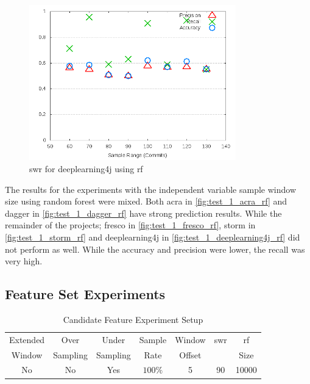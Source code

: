 \begin{figure}[!ht]
    \centering
        \includegraphics[width=0.8\textwidth]{images/rf/test_1/deeplearning4j_sample_range}
    \caption{\gls{swr} for deeplearning4j using \gls{rf}}
    \label{fig:test_1_deeplearning4j_rf}
\end{figure}

The results for the experiments with the independent variable sample window size using random forest were mixed. Both acra in \autoref{fig:test_1_acra_rf} and dagger in \autoref{fig:test_1_dagger_rf} have strong prediction results. While the remainder of the projects; fresco in \autoref{fig:test_1_fresco_rf}, storm in \autoref{fig:test_1_storm_rf} and deeplearning4j in \autoref{fig:test_1_deeplearning4j_rf} did not perform as well. While the accuracy and precision were lower, the recall was very high.

\subsection{Feature Set Experiments}

\begin{table}[h]
\begin{center}

    \begin{tabular}{|c|c|c|c|c|c|c|}
        \hline
        Extended & Over & Under & Sample & Window & \gls{swr} & \gls{rf} \\
        Window & Sampling & Sampling & Rate & Offset &  & Size \\ \hline
        No & No & Yes & $100\%$ & 5 & 90 & 10000 \\ \hline
    \end{tabular}
    \caption{Candidate Feature Experiment Setup}
    \label{tab:rf_feature_experiment_setup}
\end{center}

\end{table}

